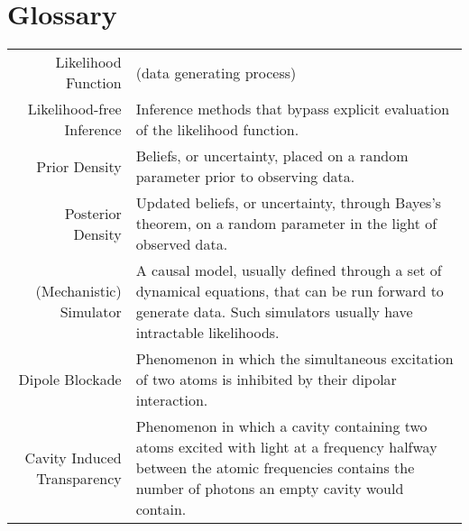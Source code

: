 \chapter*{Glossary}
\thispagestyle{plain}

\begin{center}
\begin{longtable}{r p{}}
Likelihood Function & (data generating process)
\\
Likelihood-free Inference & Inference methods that bypass explicit evaluation of the likelihood function.
\\
Prior Density & Beliefs, or uncertainty, placed on a random parameter prior to observing data. 
\\ 
Posterior Density & Updated beliefs, or uncertainty, through Bayes's theorem, on a random parameter in the light of observed data. 
\\
(Mechanistic) Simulator & A causal model, usually defined through a set of dynamical equations, that can be run forward to generate data. Such simulators usually have intractable likelihoods. 
\\ 
Dipole Blockade & Phenomenon in which the simultaneous excitation of two atoms is inhibited by their dipolar interaction. 
\\
Cavity Induced Transparency & Phenomenon in which a cavity containing two atoms excited with light at a frequency halfway between the atomic frequencies contains the number of photons an empty cavity would contain.  
\\ 
\end{longtable}
\end{center}